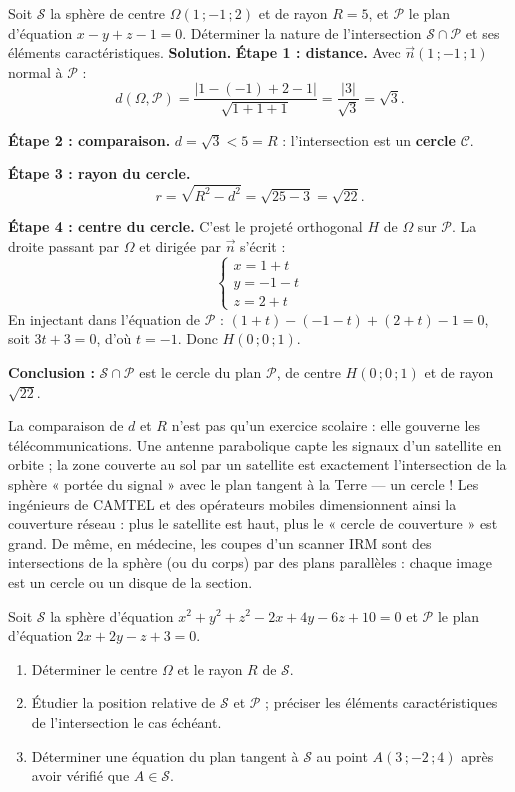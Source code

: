 \documentclass[11pt]{article}
\begin{document}
\begin{exoresolu}
Soit $\mathcal{S}$ la sphère de centre $\Omega(1\,;-1\,;2)$ et de rayon $R=5$, et $\mathcal{P}$ le plan d'équation $x-y+z-1=0$. Déterminer la nature de l'intersection $\mathcal{S}\cap\mathcal{P}$ et ses éléments caractéristiques.
\tcblower
\textbf{Solution.} \textbf{Étape 1 : distance.} Avec $\vec{n}(1\,;-1\,;1)$ normal à $\mathcal{P}$ :
\[
d(\Omega,\mathcal{P})=\frac{|1-(-1)+2-1|}{\sqrt{1+1+1}}=\frac{|3|}{\sqrt{3}}=\sqrt{3}.
\]

\textbf{Étape 2 : comparaison.} $d=\sqrt{3}<5=R$ : l'intersection est un \textbf{cercle} $\mathcal{C}$.

\textbf{Étape 3 : rayon du cercle.}
\[
r=\sqrt{R^{2}-d^{2}}=\sqrt{25-3}=\sqrt{22}.
\]

\textbf{Étape 4 : centre du cercle.} C'est le projeté orthogonal $H$ de $\Omega$ sur $\mathcal{P}$. La droite passant par $\Omega$ et dirigée par $\vec{n}$ s'écrit :
\[
\begin{cases} x=1+t \\ y=-1-t \\ z=2+t \end{cases}
\]
En injectant dans l'équation de $\mathcal{P}$ : $(1+t)-(-1-t)+(2+t)-1=0$, soit $3t+3=0$, d'où $t=-1$. Donc $H(0\,;0\,;1)$.

\textbf{Conclusion :} $\mathcal{S}\cap\mathcal{P}$ est le cercle du plan $\mathcal{P}$, de centre $H(0\,;0\,;1)$ et de rayon $\sqrt{22}$.
\end{exoresolu}

\begin{savaistu}
La comparaison de $d$ et $R$ n'est pas qu'un exercice scolaire : elle gouverne les télécommunications. Une antenne parabolique capte les signaux d'un satellite en orbite ; la zone couverte au sol par un satellite est exactement l'intersection de la sphère « portée du signal » avec le plan tangent à la Terre — un cercle ! Les ingénieurs de CAMTEL et des opérateurs mobiles dimensionnent ainsi la couverture réseau : plus le satellite est haut, plus le « cercle de couverture » est grand. De même, en médecine, les coupes d'un scanner IRM sont des intersections de la sphère (ou du corps) par des plans parallèles : chaque image est un cercle ou un disque de la section.
\end{savaistu}

\begin{exercice}
Soit $\mathcal{S}$ la sphère d'équation $x^{2}+y^{2}+z^{2}-2x+4y-6z+10=0$ et $\mathcal{P}$ le plan d'équation $2x+2y-z+3=0$.
\begin{enumerate}
\item Déterminer le centre $\Omega$ et le rayon $R$ de $\mathcal{S}$.
\item Étudier la position relative de $\mathcal{S}$ et $\mathcal{P}$ ; préciser les éléments caractéristiques de l'intersection le cas échéant.
\item Déterminer une équation du plan tangent à $\mathcal{S}$ au point $A(3\,;-2\,;4)$ après avoir vérifié que $A\in\mathcal{S}$.
\end{enumerate}
\end{exercice}
\end{document}
